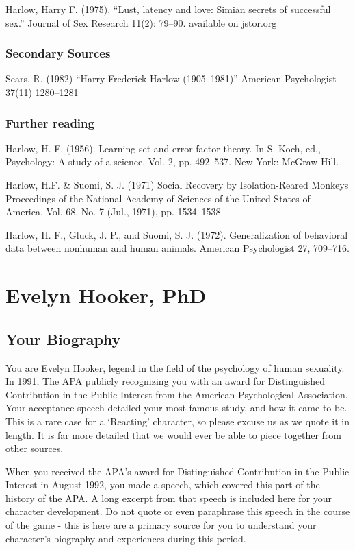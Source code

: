 \begin{refsection}
Harlow, Harry F. (1975). ``Lust, latency and love: Simian secrets of successful sex.'' Journal of Sex Research 11(2): 79--90. available on jstor.org

\subsection{Secondary Sources}
\label{secondarysources}

Sears, R. (1982) “Harry Frederick Harlow (1905--1981)” American Psychologist 37(11) 1280--1281

\subsection{Further reading}
\label{furtherreading}

Harlow, H. F. (1956). Learning set and error factor theory. In S. Koch, ed., Psychology: A study of a science, Vol. 2, pp. 492--537. New York: McGraw-Hill.

Harlow, H.F. \& Suomi, S. J. (1971) Social Recovery by Isolation-Reared Monkeys Proceedings of the National Academy of Sciences of the United States of America, Vol. 68, No. 7 (Jul., 1971), pp. 1534--1538

Harlow, H. F., Gluck, J. P., and Suomi, S. J. (1972). Generalization of behavioral data between nonhuman and human animals. American Psychologist 27, 709--716.

\chapter{Evelyn Hooker, PhD}
\label{evelynhookerphd}

\section{Your Biography}
\label{yourbiography}

You are Evelyn Hooker, legend in the field of the psychology of human sexuality. In 1991, The APA publicly recognizing you with an award for Distinguished Contribution in the Public Interest from the American Psychological Association. Your acceptance speech detailed your most famous study, and how it came to be. This is a rare case for a `Reacting' character, so please excuse us as we quote it in length. It is far more detailed that we would ever be able to piece together from other sources.

When you received the APA’s award for Distinguished Contribution in the Public Interest in August 1992, you made a speech, which covered this part of the history of the APA. A long excerpt from that speech is included here for your character development. Do not quote or even paraphrase this speech in the course of the game - this is here are a primary source for you to understand your character’s biography and experiences during this period.


\end{refsection}
